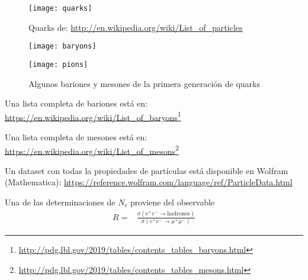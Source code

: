 \begin{frame}
\begin{figure}
  \centering
  \texttt{[image: quarks]}
  \caption{Quarks de: \url{http://en.wikipedia.org/wiki/List_of_particles}}
  \label{tab:quarks}
\end{figure}
\end{frame}
\begin{frame}
\begin{figure}
  \centering
  \texttt{[image: baryons]}
  
  \texttt{[image: pions]}
  \caption{Algunos bariones y mesones de la primera generación de quarks}
  \label{tab:baryonsmesons}
\end{figure}

Una lista completa de bariones está en: \url{https://en.wikipedia.org/wiki/List_of_baryons}\footnote{\url{http://pdg.lbl.gov/2019/tables/contents_tables_baryons.html}}

Una lista completa de mesones está en: \url{https://en.wikipedia.org/wiki/List_of_mesons}\footnote{\url{http://pdg.lbl.gov/2019/tables/contents_tables_mesons.html}}

Un dataset con todas la propiedades de partículas está disponible en Wolfram (Mathematica): \url{https://reference.wolfram.com/language/ref/ParticleData.html}

\end{frame}





Una de las determinaciones de $N_c$ proviene del observable
\begin{align}
  R=&\frac{\sigma(e^+e^-\to\text{hadrones})}{\sigma(e^+e^-\to\mu^+\mu^-)}
\end{align}

